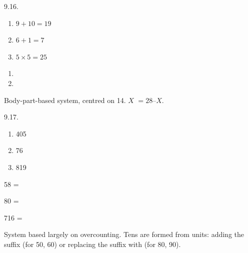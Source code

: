 \begin{refsection}
\begin{practiceproblemsolution}{9.16. \langnameTifal}

\begin{solutions}[label=Solution 9.16\alph*]
    \item
    \begin{enumerate}[label = (\arabic*)]
        \item $9+10=19$
        \item $6+1=7$
        \item $5\times5=25$
    \end{enumerate}
    \item
    \begin{enumerate}[label = (\arabic*), start = 4]
        \item {}
        \item {}
    \end{enumerate}
\end{solutions}


Body-part-based system, centred on 14.  $X$  $= 28 – X$.
\end{practiceproblemsolution}



\begin{practiceproblemsolution}{9.17. \langnameMansi}

\begin{solutions}[label=Solution 9.17\alph*]
    \item
       \begin{multicols}{3}
    \begin{enumerate}[label = \alph*., leftmargin = 1em]
        \item 405
        \item 76
        \item 819
    \end{enumerate}
    \end{multicols}
    \item 58 = 
    \item[] 80 = 
    \item[] 716 = 
\end{solutions}

\begin{sloppypar}
 System based largely on overcounting. Tens are formed from units: adding the suffix  (for 50, 60) or replacing the suffix  with  (for 80, 90).
\end{sloppypar}


\end{practiceproblemsolution}
\end{refsection}
